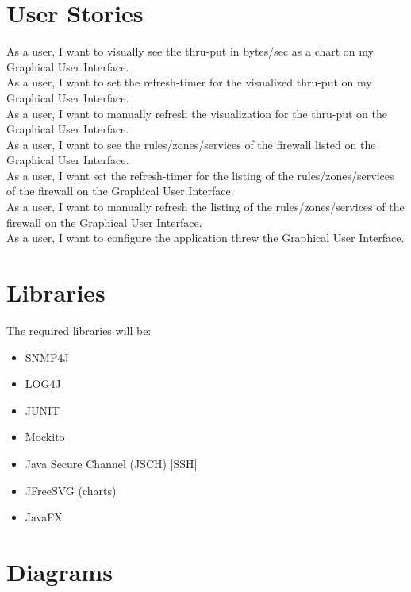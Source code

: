 \documentclass[a4paper,12pt]{scrreprt}
\begin{document}
\chapter{User Stories}
As a user, I want to visually see the thru-put in bytes/sec as a chart on my Graphical User Interface.\\

As a user, I want to set the refresh-timer for the visualized thru-put on my Graphical User Interface.\\

As a user, I want to manually refresh the visualization for the thru-put on the Graphical User Interface.\\

As a user, I want to see the rules/zones/services of the firewall listed on the Graphical User Interface.\\

As a user, I want set the refresh-timer for the listing of the rules/zones/services of the firewall on the Graphical User Interface.\\

As a user, I want to manually refresh the listing of the rules/zones/services of the firewall on the Graphical User Interface.\\

As a user, I want to configure the application threw the Graphical User Interface.\\
\chapter{Libraries}
\begin{description}
\item The required libraries will be:
\begin{itemize}
\item SNMP4J
\item LOG4J
\item JUNIT
\item Mockito
\item Java Secure Channel (JSCH) |SSH|
\item JFreeSVG (charts)
\item JavaFX
\end{itemize}
\end{description}


\chapter{Diagrams}
\end{document}
